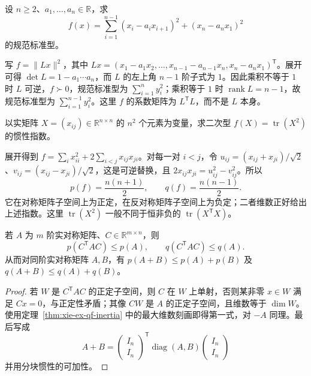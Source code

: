 \begin{example}
\label{ex:xie-ex-qf-cycle}
设 $n\ge2$、$a_1,\ldots,a_n\in\mathbb R$，求
\[
 f(x)=\sum_{i=1}^{n-1}(x_i-a_ix_{i+1})^2+(x_n-a_nx_1)^2
\]
的规范标准型。
\end{example}
\begin{solve}
写 $f=\|Lx\|^2$，其中 $Lx=(x_1-a_1x_2,\ldots,x_{n-1}-a_{n-1}x_n,x_n-a_nx_1)^{\mathsf T}$。展开可得 $\det L=1-a_1\cdots a_n$，而 $L$ 的左上角 $n-1$ 阶子式为 $1$。因此乘积不等于 $1$ 时 $L$ 可逆，$f\succ0$，规范标准型为 $\sum_{i=1}^n y_i^2$；乘积等于 $1$ 时 $\operatorname{rank}L=n-1$，故规范标准型为 $\sum_{i=1}^{n-1}y_i^2$。这里 $f$ 的系数矩阵为 $L^{\mathsf T}L$，而不是 $L$ 本身。
\end{solve}

\begin{example}
以实矩阵 $X=(x_{ij})\in\mathbb R^{n\times n}$ 的 $n^2$ 个元素为变量，求二次型 $f(X)=\operatorname{tr}(X^2)$ 的惯性指数。
\end{example}
\begin{solve}
展开得到 $f=\sum_i x_{ii}^2+2\sum_{i<j}x_{ij}x_{ji}$。对每一对 $i<j$，令 $u_{ij}=(x_{ij}+x_{ji})/\sqrt2$、$v_{ij}=(x_{ij}-x_{ji})/\sqrt2$，这是可逆替换，且 $2x_{ij}x_{ji}=u_{ij}^2-v_{ij}^2$。所以
\[
 p(f)=\frac{n(n+1)}2,\qquad q(f)=\frac{n(n-1)}2.
\]
它在对称矩阵子空间上为正定，在反对称矩阵子空间上为负定；二者维数正好给出上述指数。这里 $\operatorname{tr}(X^2)$ 一般不同于恒非负的 $\operatorname{tr}(X^{\mathsf T}X)$。
\end{solve}

\begin{proposition}
\label{prop:xie-ex-qf-inertia-compression}
若 $A$ 为 $m$ 阶实对称矩阵、$C\in\mathbb R^{m\times n}$，则
\[
 p(C^{\mathsf T}AC)\le p(A),\qquad q(C^{\mathsf T}AC)\le q(A).
\]
从而对同阶实对称矩阵 $A,B$，有 $p(A+B)\le p(A)+p(B)$ 及 $q(A+B)\le q(A)+q(B)$。
\end{proposition}
\begin{proof}
若 $W$ 是 $C^{\mathsf T}AC$ 的正定子空间，则 $C$ 在 $W$ 上单射，否则某非零 $x\in W$ 满足 $Cx=0$，与正定性矛盾；其像 $CW$ 是 $A$ 的正定子空间，且维数等于 $\dim W$。使用定理~\ref{thm:xie-ex-qf-inertia} 中的最大维数刻画即得第一式，对 $-A$ 同理。最后写成
\[
 A+B=\begin{pmatrix}I_n\\I_n\end{pmatrix}^{\mathsf T}
       \operatorname{diag}(A,B)
       \begin{pmatrix}I_n\\I_n\end{pmatrix}
\]
并用分块惯性的可加性。
\end{proof}

